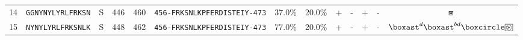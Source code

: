 \begin{tabular}{rcccccccccccc}
14 &  \texttt{GGNYNYLYRLFRKSN} &       S &    446 &   460 &  \texttt{{\scriptsize 456-}FRKSNLKPFERDISTEIY{\scriptsize -473}} &                          37.0\% &                           20.0\% &          + &           - &          + &           - &                                                                                           $ \boxast $ \\
15 &  \texttt{NYNYLYRLFRKSNLK} &       S &    448 &   462 &  \texttt{{\scriptsize 456-}FRKSNLKPFERDISTEIY{\scriptsize -473}} &                          77.0\% &                           20.0\% &          + &           - &          + &           - &                 $ \boxast^d \boxast^{bd} \boxcircle \setlength{\fboxsep}{0.5pt} \boxed{\circledast} $ \\
\bottomrule
\end{tabular}

